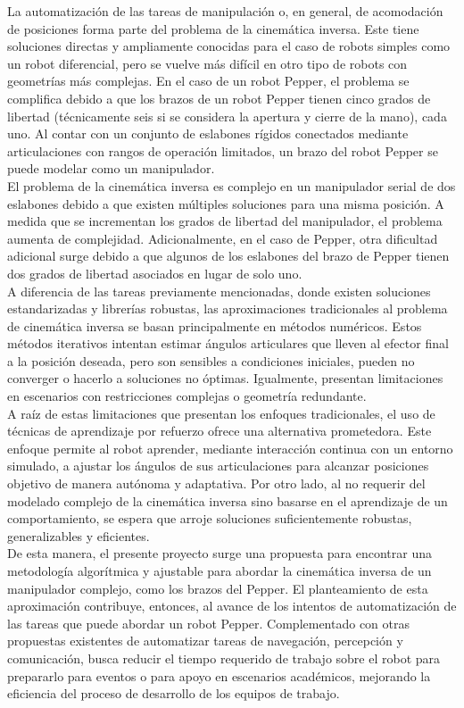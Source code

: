 La automatización de las tareas de manipulación o, en general, de acomodación de posiciones forma parte del problema de la cinemática inversa. Este tiene soluciones directas y ampliamente conocidas para el caso de robots simples como un robot diferencial, pero se vuelve más difícil en otro tipo de robots con geometrías más complejas. En el caso de un robot Pepper, el problema se complifica debido a que los brazos de un robot Pepper tienen cinco grados de libertad (técnicamente seis si se considera la apertura y cierre de la mano), cada uno. Al contar con un conjunto de eslabones rígidos conectados mediante articulaciones con rangos de operación limitados, un brazo del robot Pepper se puede modelar como un manipulador. \\

El problema de la cinemática inversa es complejo en un manipulador serial de dos eslabones debido a que existen múltiples soluciones para una misma posición. A medida que se incrementan los grados de libertad del manipulador, el problema aumenta de complejidad. Adicionalmente, en el caso de Pepper, otra dificultad adicional surge debido a que algunos de los eslabones del brazo de Pepper tienen dos grados de libertad asociados en lugar de solo uno. \\

A diferencia de las tareas previamente mencionadas, donde existen soluciones estandarizadas y librerías robustas, las aproximaciones tradicionales al problema de cinemática inversa se basan principalmente en métodos numéricos. Estos métodos iterativos intentan estimar ángulos articulares que lleven al efector final a la posición deseada, pero son sensibles a condiciones iniciales, pueden no converger o hacerlo a soluciones no óptimas. Igualmente, presentan limitaciones en escenarios con restricciones complejas o geometría redundante.\\

A raíz de estas limitaciones que presentan los enfoques tradicionales, el uso de técnicas de aprendizaje por refuerzo ofrece una alternativa prometedora. Este enfoque permite al robot aprender, mediante interacción continua con un entorno simulado, a ajustar los ángulos de sus articulaciones para alcanzar posiciones objetivo de manera autónoma y adaptativa. Por otro lado, al no requerir del modelado complejo de la cinemática inversa sino basarse en el aprendizaje de un comportamiento, se espera que arroje soluciones suficientemente robustas, generalizables y eficientes.\\

De esta manera, el presente proyecto surge una propuesta para encontrar una metodología algorítmica y ajustable para abordar la cinemática inversa de un manipulador complejo, como los brazos del Pepper. El planteamiento de esta aproximación contribuye, entonces, al avance de los intentos de automatización de las tareas que puede abordar un robot Pepper. Complementado con otras propuestas existentes de automatizar tareas de navegación, percepción y comunicación, busca reducir el tiempo requerido de trabajo sobre el robot para prepararlo para eventos o para apoyo en escenarios académicos, mejorando la eficiencia del proceso de desarrollo de los equipos de trabajo.\\

